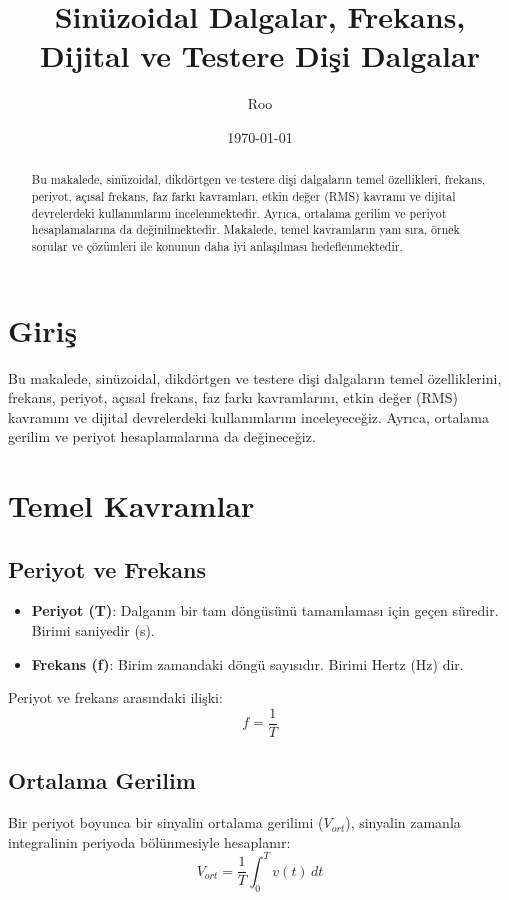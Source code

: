 \documentclass[11pt,letterpaper]{fenbil}
\title{\textbf{Sinüzoidal Dalgalar, Frekans, Dijital ve Testere Dişi Dalgalar}}
\author{Roo} %
\date{\today} %
\begin{document}
\maketitle
\begin{spacing}{1.2} %

\begin{abstract}
Bu makalede, sinüzoidal, dikdörtgen ve testere dişi dalgaların temel özellikleri, frekans, periyot, açısal frekans, faz farkı kavramları, etkin değer (RMS) kavramı ve dijital devrelerdeki kullanımlarını incelenmektedir. Ayrıca, ortalama gerilim ve periyot hesaplamalarına da değinilmektedir. Makalede, temel kavramların yanı sıra, örnek sorular ve çözümleri ile konunun daha iyi anlaşılması hedeflenmektedir.
\end{abstract}

\section*{Giriş}
Bu makalede, sinüzoidal, dikdörtgen ve testere dişi dalgaların temel özelliklerini, frekans, periyot, açısal frekans, faz farkı kavramlarını, etkin değer (RMS) kavramını ve dijital devrelerdeki kullanımlarını inceleyeceğiz. Ayrıca, ortalama gerilim ve periyot hesaplamalarına da değineceğiz.

\section*{Temel Kavramlar}

\subsection*{Periyot ve Frekans}
\begin{itemize}
\item \textbf{Periyot (T)}: Dalganın bir tam döngüsünü tamamlaması için geçen süredir. Birimi saniyedir (s).
\item \textbf{Frekans (f)}: Birim zamandaki döngü sayısıdır. Birimi Hertz (Hz) dir.
\end{itemize}

Periyot ve frekans arasındaki ilişki:
\[
f = \frac{1}{T}
\]

\subsection*{Ortalama Gerilim}
Bir periyot boyunca bir sinyalin ortalama gerilimi ($V_{ort}$), sinyalin zamanla integralinin periyoda bölünmesiyle hesaplanır:
\[
V_{ort} = \frac{1}{T} \int_{0}^{T} v(t) \, dt
\]


\end{spacing}
\end{document}
